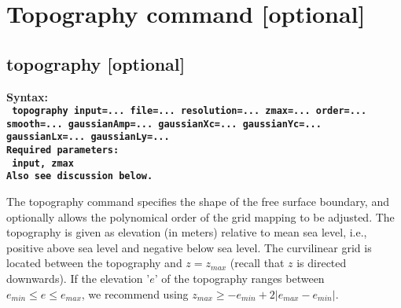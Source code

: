 \documentclass[11pt]{report}
\begin{document}
\section{Topography command [optional]}

\subsection{topography [optional]}
\label{keyword:topo}
\begin{flushleft}
\bf
Syntax:\\
\tt 
topography input=... file=... resolution=... zmax=... order=... smooth=... gaussianAmp=... gaussianXc=... gaussianYc=... gaussianLx=... gaussianLy=...\\
\bf 
Required parameters:\\
\tt 
input, zmax\\
\rm Also see discussion below.
\end{flushleft}
The topography command specifies the shape of the free surface boundary, and optionally allows the
polynomical order of the grid mapping to be adjusted. The topography is given as elevation (in
meters) relative to mean sea level, i.e., positive above sea level and negative below sea level. The
curvilinear grid is located between the topography and $z=z_{max}$ (recall that $z$ is directed
downwards). If the elevation '$e$' of the topography ranges between $e_{min}\leq e \leq e_{max}$, we
recommend using $z_{max} \geq -e_{min} + 2|e_{max} - e_{min}|$.
\end{document}
